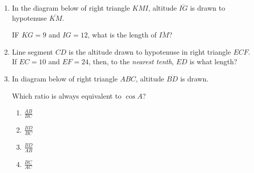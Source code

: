 \documentclass[12pt, oneside]{article}
\begin{document}
\begin{enumerate}[itemsep=0cm]
\item In the diagram below of right triangle $KMI$, altitude $\overline{IG}$ is drawn to hypotenuse $\overline{KM}$.
  \begin{center}
  \end{center}
IF $KG=9$ and $IG=12$, what is the length of $\overline{IM}$?

\item Line segment $CD$ is the altitude drawn to hypotenuse in right
triangle $ECF$. If $EC=10$ and $EF=24$, then, to the \emph{nearest
tenth}, $ED$ is what length?

\item In diagram below of right triangle $ABC$, altitude $\overline{BD}$ is drawn.
  \begin{center}
  \end{center}
Which ratio is always equivalent to $\cos A$?
\begin{multicols}{2}
  \begin{enumerate}
    \item $\displaystyle \frac{AB}{BC}$
    \item $\displaystyle \frac{BD}{BC}$ 
    \item $\displaystyle \frac{BD}{AB}$
    \item $\displaystyle \frac{BC}{AC}$
  \end{enumerate}
\end{multicols}


\newpage

\end{enumerate}
\end{document}
